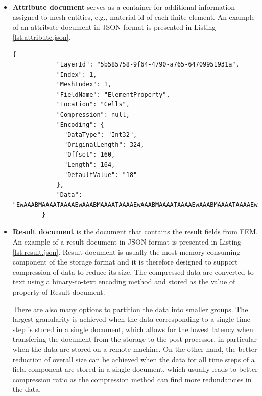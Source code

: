 \begin{itemize}
    \item \textbf{Attribute document} serves as a container for additional information assigned to mesh entities, e.g., material id of each finite element. An example of an attribute document in JSON format is presented in Listing \ref{lst:attribute.json}.

    \begin{lstlisting}[style=json,caption=Example of attribute.json document.,label=lst:attribute.json]
        {
            "LayerId": "5b585758-9f64-4790-a765-64709951931a",
            "Index": 1,
            "MeshIndex": 1,
            "FieldName": "ElementProperty",
            "Location": "Cells",
            "Compression": null,
            "Encoding": {
              "DataType": "Int32",
              "OriginalLength": 324,
              "Offset": 160,
              "Length": 164,
              "DefaultValue": "18"
            },
            "Data": "EwAAABMAAAATAAAAEwAAABMAAAATAAAAEwAAABMAAAATAAAAEwAAABMAAAATAAAAEwAAABMAAAATAAAAEwAAAB..."
        }
    \end{lstlisting}

    \item \textbf{Result document} is the document that contains the result fields from FEM. An example of a result document in JSON format is presented in Listing \ref{lst:result.json}. Result document is usually the most memory-consuming component of the storage format and it is therefore designed to support compression of data to reduce its size. The compressed data are converted to text using a binary-to-text encoding method and stored as the value of  property of Result document.

    There are also many options to partition the data into smaller groups. The largest granularity is achieved when the data corresponding to a single time step is stored in a single document, which allows for the lowest latency when transfering the document from the storage to the post-processor, in particular when the data are stored on a remote machine. On the other hand, the better reduction of overall size can be achieved when the data for all time steps of a field component are stored in a single document, which usually leads to better compression ratio as the compression method can find more redundancies in the data.


\end{itemize}
